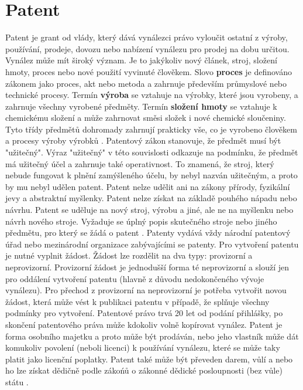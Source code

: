 \chapter{Patent}
Patent je grant od vlády, který dává vynálezci právo vyloučit ostatní z výroby, používání, prodeje, dovozu nebo nabízení vynálezu pro prodej na dobu určitou. Vynález může mít široký význam. Je to jakýkoliv nový článek, stroj, složení hmoty, proces nebo nové použití vyvinuté člověkem. Slovo \textbf{proces} je definováno zákonem jako proces, akt nebo metoda a zahrnuje především průmyslové nebo technické procesy. Termín \textbf{výroba} se vztahuje na výrobky, které jsou vyrobeny, a zahrnuje všechny vyrobené předměty. Termín \textbf{složení hmoty} se vztahuje k chemickému složení a může zahrnovat směsi složek i nové chemické sloučeniny. Tyto třídy předmětů dohromady zahrnují prakticky vše, co je vyrobeno člověkem a procesy výroby výrobků \cite{patentIntroduction, usptoPatent}.
\newline
\indent Patentový zákon stanovuje, že předmět musí být "užitečný". Výraz "užitečný" v této souvislosti odkazuje na podmínku, že předmět má užitečný účel a zahrnuje také operativnost. To znamená, že stroj, který nebude fungovat k plnění zamýšleného účelu, by nebyl nazván užitečným, a proto by mu nebyl udělen patent. Patent nelze udělit ani na zákony přírody, fyzikální jevy a abstraktní myšlenky.
\newline
\indent Patent nelze získat na základě pouhého nápadu nebo návrhu. Patent se uděluje na nový stroj, výrobu a jiné, ale ne na myšlenku nebo návrh nového stroje. Vyžaduje se úplný popis skutečného stroje nebo jiného předmětu, pro který se žádá o patent \cite{usptoPatent}.
\newline
\indent Patenty vydává vždy národní patentový úřad nebo mezinárodní organizace zabývajícími se patenty. Pro vytvoření patentu je nutné vyplnit žádost. Žádost lze rozdělit na dva typy: provizorní a neprovizorní. Provizorní žádost je jednodušší forma té neprovizorní a slouží jen pro oddálení vytvoření patentu (hlavně z důvodu nedokončeného vývoje vynálezu). Pro přechod z provizorní na neprovizorní je potřeba vytvořit novou žádost, která může vést k publikaci patentu v případě, že splňuje všechny podmínky pro vytvoření.
\newline
\indent Patentové právo trvá 20 let od podání přihlášky, po skončení patentového práva může kdokoliv volně kopírovat vynález. Patent je forma osobního majetku a proto může být prodáván, nebo jeho vlastník může dát komukoliv povolení (neboli licenci) k používání vynálezu, které se může taky platit jako licenční poplatky. Patent také může být převeden darem, vůlí a nebo ho lze získat dědičně podle zákońů o zákonné dědické posloupnosti (bez vůle) státu \cite{patentIntroduction}.

